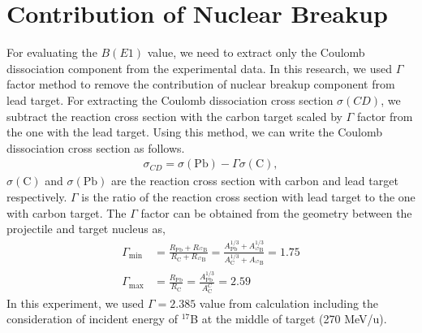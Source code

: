 \section{Contribution of Nuclear Breakup}
For evaluating the $B(E1)$ value, we need to extract only the Coulomb dissociation component from the experimental data. In this research, we used $\Gamma$ factor method to remove the contribution of nuclear breakup component from lead target. For extracting the Coulomb dissociation cross section $\sigma(CD)$, we subtract the reaction cross section with the carbon target scaled by $\Gamma$ factor from the one with the lead target. Using this method, we can write the Coulomb dissociation cross section as follows.
\begin{align}
    \sigma_{CD} = \sigma(\text{Pb}) - \Gamma \sigma(\text{C}),\label{eq:CD}
\end{align}
$\sigma(\text{C})$ and $\sigma(\text{Pb})$ are the reaction cross section with carbon and lead target respectively. $\Gamma$ is the ratio of the reaction cross section with lead target to the one with carbon target. The $\Gamma$ factor can be obtained from the geometry between the projectile and target nucleus as,
\begin{align}
    \Gamma_{\text{min}} &= \frac{R_{\text{Pb}} + R_{{}^{17}\text{B}}}{R_{\text{C}} + R_{{}^{17}\text{B}}} = \frac{A_{\text{Pb}}^{1/3} + A_{^{17}\text{B}}^{1/3}}{A_{\text{C}}^{1/3} + A_{^{17}\text{B}}} = 1.75\\
    \Gamma_{\text{max}} &= \frac{R_{\text{Pb}}}{R_{\text{C}}} = \frac{A_{\text{Pb}}^{1/3}}{A_{\text{C}}^{C}} = 2.59
\end{align}
In this experiment, we used $\Gamma = 2.385$ value from calculation including the consideration of incident energy of $^{17}$B at the middle of target (270 MeV/u)\cite{Ogata}.

